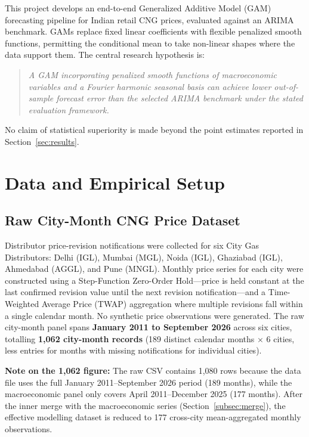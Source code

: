 \documentclass[11pt,a4paper]{article}
\begin{document}
This project develops an end-to-end Generalized Additive Model (GAM)
forecasting pipeline for Indian retail CNG prices, evaluated against an
ARIMA benchmark.  GAMs replace fixed linear coefficients with flexible penalized
smooth functions, permitting the conditional mean to take non-linear shapes where
the data support them.  The central research hypothesis is:

\begin{quote}
\textit{A GAM incorporating penalized smooth functions of macroeconomic
variables and a Fourier harmonic seasonal basis can achieve lower
out-of-sample forecast error than the selected ARIMA benchmark under the
stated evaluation framework.}
\end{quote}

\noindent No claim of statistical superiority is made beyond the point
estimates reported in Section~\ref{sec:results}.

\section{Data and Empirical Setup}

\subsection{Raw City-Month CNG Price Dataset}

Distributor price-revision notifications were collected for six City Gas
Distributors: Delhi (IGL), Mumbai (MGL), Noida (IGL), Ghaziabad (IGL),
Ahmedabad (AGGL), and Pune (MNGL).  Monthly price series for each city were
constructed using a Step-Function Zero-Order Hold---price is held constant at
the last confirmed revision value until the next revision notification---and a
Time-Weighted Average Price (TWAP) aggregation where multiple revisions fall
within a single calendar month.  No synthetic price observations were generated.
The raw city-month panel spans \textbf{January 2011 to September 2026} across
six cities, totalling \textbf{1,062 city-month records} (189 distinct
calendar months $\times$ 6 cities, less entries for months with missing
notifications for individual cities).

\textbf{Note on the 1,062 figure:} The raw CSV contains 1,080 rows because
the data file uses the full January 2011--September 2026 period (189 months),
while the macroeconomic panel only covers April 2011--December 2025 (177
months).  After the inner merge with the macroeconomic series
(Section~\ref{subsec:merge}), the effective modelling dataset is reduced to
177 cross-city mean-aggregated monthly observations.
\end{document}
